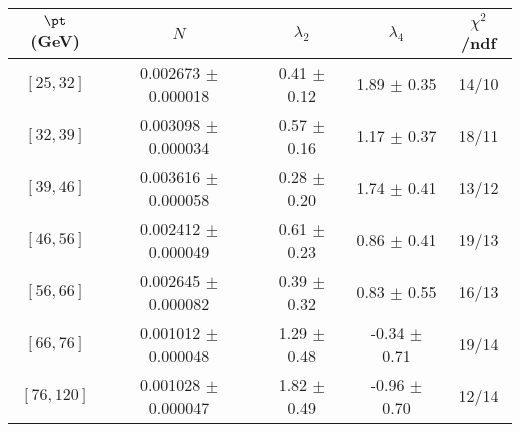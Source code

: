 \begin{tabular}{c||c|c|c|c}
$\pt$ (GeV) & $N$ & $\lambda_{2}$ & $\lambda_4$  & $\chi^2$/ndf  \\
\hline
$[25, 32]$ & 0.002673 $\pm$ 0.000018 & 0.41 $\pm$ 0.12 & 1.89 $\pm$ 0.35 & 14/10\\
$[32, 39]$ & 0.003098 $\pm$ 0.000034 & 0.57 $\pm$ 0.16 & 1.17 $\pm$ 0.37 & 18/11\\
$[39, 46]$ & 0.003616 $\pm$ 0.000058 & 0.28 $\pm$ 0.20 & 1.74 $\pm$ 0.41 & 13/12\\
$[46, 56]$ & 0.002412 $\pm$ 0.000049 & 0.61 $\pm$ 0.23 & 0.86 $\pm$ 0.41 & 19/13\\
$[56, 66]$ & 0.002645 $\pm$ 0.000082 & 0.39 $\pm$ 0.32 & 0.83 $\pm$ 0.55 & 16/13\\
$[66, 76]$ & 0.001012 $\pm$ 0.000048 & 1.29 $\pm$ 0.48 & -0.34 $\pm$ 0.71 & 19/14\\
$[76, 120]$ & 0.001028 $\pm$ 0.000047 & 1.82 $\pm$ 0.49 & -0.96 $\pm$ 0.70 & 12/14\\
\end{tabular}
